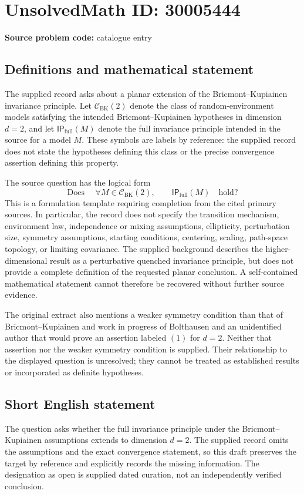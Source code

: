 \documentclass[11pt]{article}
\begin{document}
\section*{UnsolvedMath ID: 30005444}
\textbf{Source problem code:} catalogue entry
\subsection{Definitions and mathematical statement}
The supplied record asks about a planar extension of the Bricmont--Kupiainen invariance principle. Let \(\mathcal C_{\mathrm{BK}}(2)\) denote the class of random-environment models satisfying the intended Bricmont--Kupiainen hypotheses in dimension \(d=2\), and let \(\mathsf{IP}_{\mathrm{full}}(M)\) denote the full invariance principle intended in the source for a model \(M\). These symbols are labels by reference: the supplied record does not state the hypotheses defining this class or the precise convergence assertion defining this property.

The source question has the logical form
\[
\text{Does }\quad
\forall M\in\mathcal C_{\mathrm{BK}}(2),\qquad
\mathsf{IP}_{\mathrm{full}}(M)
\quad\text{hold?}
\]
This is a formulation template requiring completion from the cited primary sources. In particular, the record does not specify the transition mechanism, environment law, independence or mixing assumptions, ellipticity, perturbation size, symmetry assumptions, starting conditions, centering, scaling, path-space topology, or limiting covariance. The supplied background describes the higher-dimensional result as a perturbative quenched invariance principle, but does not provide a complete definition of the requested planar conclusion. A self-contained mathematical statement cannot therefore be recovered without further source evidence.

The original extract also mentions a weaker symmetry condition than that of Bricmont--Kupiainen and work in progress of Bolthausen and an unidentified author that would prove an assertion labeled \((1)\) for \(d=2\). Neither that assertion nor the weaker symmetry condition is supplied. Their relationship to the displayed question is unresolved; they cannot be treated as established results or incorporated as definite hypotheses.
\subsection{Short English statement}
The question asks whether the full invariance principle under the Bricmont--Kupiainen assumptions extends to dimension \(d=2\). The supplied record omits the assumptions and the exact convergence statement, so this draft preserves the target by reference and explicitly records the missing information. The designation as open is supplied dated curation, not an independently verified conclusion.
\end{document}
